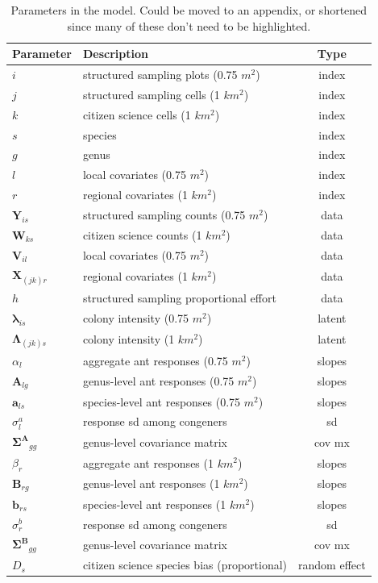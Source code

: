 \documentclass[preprint,review,times,12pt]{elsarticle}
\begin{document}
\begin{table}[ht]
	\centering
	\begin{tabular}{ l l c }
		\hline
		\textbf{Parameter} & \textbf{Description} & \textbf{Type} \\
		\hline
		$i$ & structured sampling plots (0.75 $m^2$) & index \\
		$j$ & structured sampling cells (1 $km^2$) & index \\
		$k$ & citizen science cells (1 $km^2$) & index \\
		$s$ & species & index \\
		$g$ & genus & index \\
		$l$ & local covariates (0.75 $m^2$) & index \\
		$r$ & regional covariates (1 $km^2$) & index \\
		\hline
		$\mathbf{Y}_{is}$ & structured sampling counts (0.75 $m^2$) & data \\
		$\mathbf{W}_{ks}$ & citizen science counts (1 $km^2$) & data \\
		$\mathbf{V}_{il}$ & local covariates (0.75 $m^2$) & data \\
		$\mathbf{X}_{(jk)r}$ & regional covariates (1 $km^2$) & data \\
		$h$ & structured sampling proportional effort & data \\
		\hline
		$\mathbf{\lambda}_{is}$ & colony intensity (0.75 $m^2$) & latent \\
		$\mathbf{\Lambda}_{(jk)s}$ & colony intensity (1 $km^2$) & latent \\
		\hline
		$\alpha_{l}$ & aggregate ant responses (0.75 $m^2$) & slopes \\
		$\mathbf{A}_{lg}$ & genus-level ant responses (0.75 $m^2$) & slopes \\
		$\mathbf{a}_{ls}$ & species-level ant responses (0.75 $m^2$) & slopes \\
		$\sigma^a_{l}$ & response sd among congeners & sd \\
		$\mathbf{\Sigma^A}_{gg}$ & genus-level covariance matrix & cov mx \\
		$\beta_{r}$ & aggregate ant responses (1 $km^2$) & slopes \\
		$\mathbf{B}_{rg}$ & genus-level ant responses (1 $km^2$) & slopes \\
		$\mathbf{b}_{rs}$ & species-level ant responses (1 $km^2$) & slopes \\
		$\sigma^b_{r}$ & response sd among congeners & sd \\
		$\mathbf{\Sigma^B}_{gg}$ & genus-level covariance matrix & cov mx \\
		$D_{s}$ & citizen science species bias (proportional) & random effect \\
	\end{tabular}
	\caption{\label{table:params} Parameters in the model. Could be moved to an appendix, or shortened since many of these don't need to be highlighted. }
\end{table}
\end{document}
